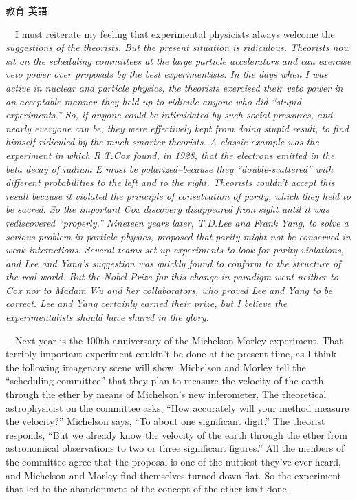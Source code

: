 \documentclass[fleqn]{jbook}
\begin{document}
\begin{question}{教育 英語}{}
\begin{subquestions}
   　I must reiterate my feeling that experimental physicists always
   welcome the \em suggestions \em of the theorists. But the present
   situation is ridiculous. Theorists now sit on the scheduling
   committees at the large particle accelerators and can exercise veto
   power over proposals by the best experimentists. In the days when I
   was active in nuclear and particle physics, the theorists exercised
   their veto power in an acceptable manner--they held up to ridicule
   anyone who did ``stupid experiments.'' So, if anyone could be
   intimidated by such social pressures, and nearly everyone can be,
   they were effectively kept from doing stupid result, to find
   himself ridiculed by the much smarter theorists. A classic example
   was the experiment in which R.T.Cox found, in 1928, that the
   electrons emitted in the beta decay of radium E must be
   polarized--because they ``double-scattered'' with different
   probabilities to the left and to the right.  Theorists couldn't
   accept this result because it violated the principle of
   consetvation of parity, which they held to be sacred. So the
   important Cox discovery disappeared from sight until it was
   rediscovered ``properly.''  Nineteen years later, T.D.Lee and Frank
   Yang, to solve a serious problem in particle physics, proposed that
   parity might not be conserved in weak interactions. Several teams
   set up experiments to look for parity violations, and Lee and
   Yang's suggestion was quickly found to conform to the structure of
   the real world. But the Nobel Prize for this change in paradigm
   went neither to Cox nor to Madam Wu and her collaborators, who
   proved Lee and Yang to be correct. Lee and Yang certainly earned
   their prize, but I believe the experimentalists should have shared
   in the glory.

   　Next year is the 100th anniversary of the Michelson-Morley
   experiment. That terribly important experiment couldn't be done at
   the present time, as I think the following imagenary scene will
   show. Michelson and Morley tell the ``scheduling committee'' that
   they plan to measure the velocity of the earth through the ether by
   means of Michelson's new inferometer. The theoretical
   astrophysicist on the committee asks, ``How accurately will your
   method measure the velocity?'' Michelson says, ``To about one
   significant digit.'' The theorist responds, ``But we already know the
   velocity of the earth through the ether from astronomical
   observations to two or three significant figures.'' All the menbers
   of the committee agree that the proposal is one of the nuttiest
   they've ever heard, and Michelson and Morley find themselves turned
   down flat. So the experiment that led to the abandonment of the
   concept of the ether isn't done.


\end{subquestions}
\end{question}
\end{document}
